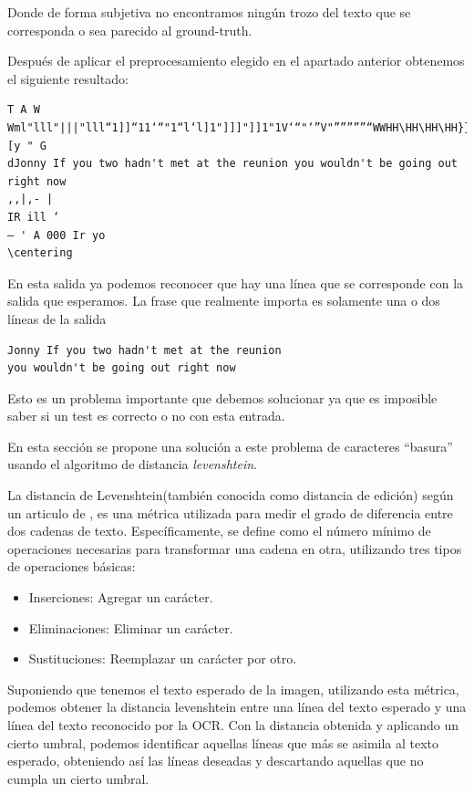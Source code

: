 Donde de forma subjetiva no encontramos ningún trozo del texto que se corresponda o sea parecido al ground-truth.

Después de aplicar el preprocesamiento elegido en el apartado anterior obtenemos el siguiente resultado:

\begin{verbatim}
T A W
Wml"lll"|||"lll“1]]“11‘“"1“l‘l]1"]]]"]]1"1V‘“"‘”V"”””””“WWHH\HH\HH\HH}}}}111111111”‘””}"“H‘H”H‘mwwmm‘ [y " G
dJonny If you two hadn't met at the reunion you wouldn't be going out right now
,,|,- |
IR ill ‘
— ' A 000 Ir yo
\centering
\end{verbatim}

En esta salida ya podemos reconocer que hay una línea que se corresponde con la salida que esperamos.
La frase que realmente importa es solamente una o dos líneas de la salida
\begin{verbatim}
Jonny If you two hadn't met at the reunion
you wouldn't be going out right now
\end{verbatim}
Esto es un problema importante que debemos solucionar ya que es imposible saber si un test es correcto o no con esta entrada.

En esta sección se propone una solución a este problema de caracteres ``basura'' usando el algoritmo de distancia \emph{levenshtein}.

La distancia de Levenshtein(también conocida como distancia de edición) según un articulo de \cite{LevDistance}, es una métrica utilizada para medir el grado de diferencia entre dos cadenas de texto. Específicamente, se define como el número mínimo de operaciones necesarias para transformar una cadena en otra, utilizando tres tipos de operaciones básicas:
\begin{itemize}
\item Inserciones: Agregar un carácter.
\item Eliminaciones: Eliminar un carácter.
\item Sustituciones: Reemplazar un carácter por otro.
\end{itemize}

Suponiendo que tenemos el texto esperado de la imagen,  utilizando esta métrica, podemos obtener la distancia levenshtein entre una línea del texto esperado y una línea del texto reconocido por la OCR. Con la distancia obtenida y aplicando un cierto umbral, podemos identificar aquellas líneas que más se asimila al texto esperado, obteniendo así las líneas deseadas y descartando aquellas que no cumpla un cierto umbral.

